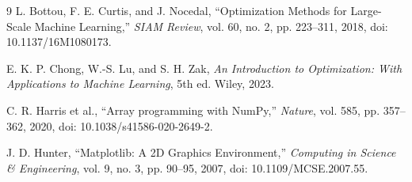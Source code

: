 \documentclass[11pt,onecolumn]{article}
\begin{document}
\begin{thebibliography}{9}
L. Bottou, F. E. Curtis, and J. Nocedal, ``Optimization Methods for Large-Scale Machine Learning,'' \textit{SIAM Review}, vol. 60, no. 2, pp. 223--311, 2018, doi: 10.1137/16M1080173.

E. K. P. Chong, W.-S. Lu, and S. H. Zak,
\textit{An Introduction to Optimization: With Applications to Machine Learning},
5th ed. Wiley, 2023.

C. R. Harris et al., ``Array programming with NumPy,'' \textit{Nature}, vol. 585, pp. 357--362, 2020, doi: 10.1038/s41586-020-2649-2.

J. D. Hunter, ``Matplotlib: A 2D Graphics Environment,'' \textit{Computing in Science \& Engineering}, vol. 9, no. 3, pp. 90--95, 2007, doi: 10.1109/MCSE.2007.55.
\end{thebibliography}
\end{document}
